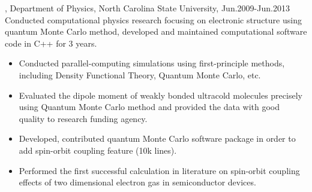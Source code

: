 \documentclass[11pt]{article} %
\begin{document}
, Department of Physics, North Carolina State University, Jun.2009-Jun.2013\\
\noindent Conducted computational physics research focusing on electronic structure using quantum Monte Carlo method, developed and maintained computational software code in C++ for 3 years.\\
\begin{itemize}
\item Conducted parallel-computing simulations using first-principle methods, including Density Functional Theory, Quantum Monte Carlo, etc.\\
\vspace{-4mm}  
\item Evaluated the dipole moment of weakly bonded ultracold molecules precisely using Quantum Monte Carlo method and provided the data with good quality to research funding agency.\\
\vspace{-4mm}
  \item Developed, contributed quantum Monte Carlo software package in order to add spin-orbit coupling feature (10k lines).\\
\vspace{-4mm}
  \item Performed the first successful calculation in literature on spin-orbit coupling effects of two dimensional electron gas in semiconductor devices.\\
\end{itemize}
\end{document}

